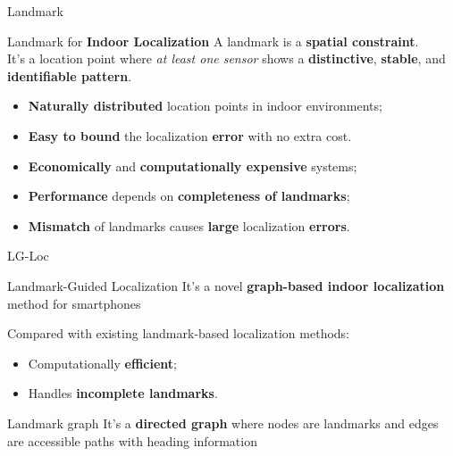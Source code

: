 \begin{frame}{Landmark}
    \begin{block}{Landmark for \textbf{Indoor Localization}}
        A landmark is a \textbf{spatial constraint}.\\
        It's a location point where \textit{at least one sensor} shows a \textbf{distinctive}, \textbf{stable}, and \textbf{identifiable pattern}.
    \end{block}
    
    \begin{itemize}
        \item \textbf{Naturally distributed} location points in indoor environments;
        \item \textbf{Easy to bound} the localization \textbf{error} with no extra cost.
    \end{itemize}
    
    \begin{itemize}
        \item \textbf{Economically} and \textbf{computationally expensive} systems;
        \item \textbf{Performance} depends on \textbf{completeness of landmarks};
        \item \textbf{Mismatch} of landmarks causes \textbf{large} localization \textbf{errors}.
    \end{itemize}
    
\end{frame}

\begin{frame}{LG-Loc}
    \begin{block}{Landmark-Guided Localization}
        It's a novel \textbf{graph-based indoor localization} method for smartphones
    \end{block}

    Compared with existing landmark-based localization methods:
    \begin{itemize}
        \item Computationally \textbf{efficient};
        \item Handles \textbf{incomplete landmarks}.
    \end{itemize}

    \begin{block}{Landmark graph}
        It's a \textbf{directed graph} where nodes are landmarks and edges are accessible paths with heading information
    \end{block}
\end{frame}

